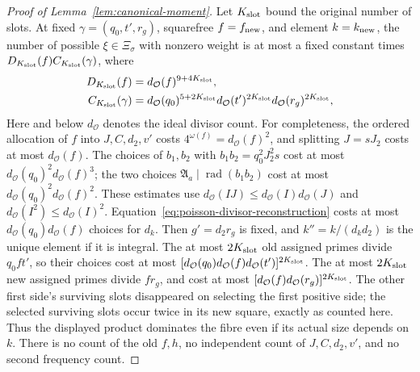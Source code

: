 \documentclass[11pt,a4paper]{article}
\numberwithin{equation}{section}
\numberwithin{figure}{section}
\theoremstyle{definition}
\theoremstyle{remark}
\begin{document}
\begin{proof}[Proof of Lemma~\ref{lem:canonical-moment}]
Let \(K_{\rm slot}\) bound the original number of slots.  At fixed
\(\gamma=(q_0,t',r_g)\), squarefree \(f=f_{\rm new}\), and element
\(k=k_{\rm new}\), the number of possible \(\xi\in\Xi_\sigma\) with
nonzero weight is at most a fixed constant times
\(D_{K_{\rm slot}}(f)C_{K_{\rm slot}}(\gamma)\), where
\begin{equation}\label{eq:inverse-new-fibre}
 \begin{split}
 D_{K_{\rm slot}}(f)&=d_{\mathcal O}(f)^{9+4K_{\rm slot}},\\
 C_{K_{\rm slot}}(\gamma)&=
 d_{\mathcal O}(q_0)^{5+2K_{\rm slot}}
 d_{\mathcal O}(t')^{2K_{\rm slot}}
 d_{\mathcal O}(r_g)^{2K_{\rm slot}},
 \end{split}
\end{equation}
Here and below \(d_{\mathcal O}\) denotes the ideal divisor count.
For completeness, the ordered allocation of \(f\) into
\(J,C,d_2,v'\) costs \(4^{\omega(f)}=d_{\mathcal O}(f)^2\), and
splitting \(J=sJ_2\) costs at most \(d_{\mathcal O}(f)\).
The choices of \(b_1,b_2\) with
\(b_1b_2=q_0^2J_2^2s\) cost at most
\(d_{\mathcal O}(q_0)^2d_{\mathcal O}(f)^3\); the two choices
\(\mathfrak A_a\mid\operatorname{rad}(b_1b_2)\) cost at most
\(d_{\mathcal O}(q_0)^2d_{\mathcal O}(f)^2\).  These estimates use
\(d_{\mathcal O}(IJ)\le d_{\mathcal O}(I)d_{\mathcal O}(J)\) and
\(d_{\mathcal O}(I^2)\le d_{\mathcal O}(I)^2\).
Equation~\eqref{eq:poisson-divisor-reconstruction} costs at most
\(d_{\mathcal O}(q_0)d_{\mathcal O}(f)\) choices for \(d_k\).
Then \(g'=d_2r_g\) is fixed, and \(k''=k/(d_kd_2)\) is the unique
element if it is integral.  The at most \(2K_{\rm slot}\) old assigned
primes divide \(q_0ft'\), so their choices cost at most
\([d_{\mathcal O}(q_0)d_{\mathcal O}(f)d_{\mathcal O}(t')]^{2K_{\rm slot}}\).
The at most \(2K_{\rm slot}\) new assigned primes divide \(fr_g\),
and cost at most
\([d_{\mathcal O}(f)d_{\mathcal O}(r_g)]^{2K_{\rm slot}}\).
The other first side's surviving slots disappeared on selecting the
first positive side; the selected surviving slots occur twice in its
new square, exactly as counted here.  Thus the displayed product
dominates the fibre even if its actual size depends on \(k\).
There is no count of the old \(f,h\), no independent count of
\(J,C,d_2,v'\), and no second frequency count.


\end{proof}
\end{document}
